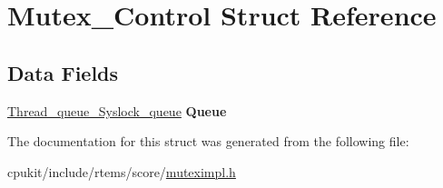 \hypertarget{structMutex__Control}{}\section{Mutex\+\_\+\+Control Struct Reference}
\label{structMutex__Control}
\subsection*{Data Fields}
\begin{DoxyCompactItemize}
\item 
\mbox{\label{structMutex__Control_aeef81977c6b93dac15e62602cb670d50}} 
\mbox{\hyperlink{structThread__queue__Syslock__queue}{Thread\+\_\+queue\+\_\+\+Syslock\+\_\+queue}} {\bfseries Queue}
\end{DoxyCompactItemize}


The documentation for this struct was generated from the following file\+:\begin{DoxyCompactItemize}
\item 
cpukit/include/rtems/score/\mbox{\hyperlink{score_2muteximpl_8h}{muteximpl.\+h}}\end{DoxyCompactItemize}
